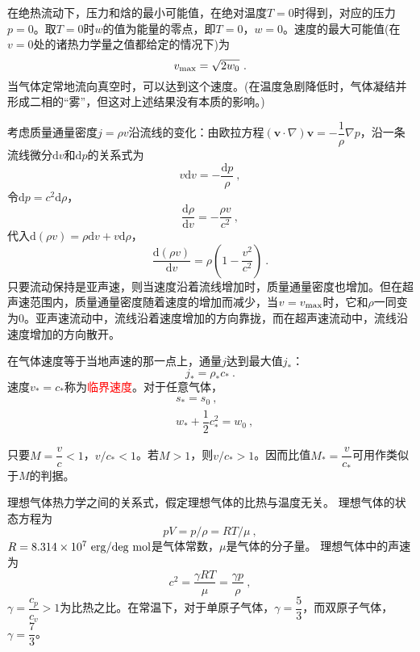 \documentclass[12pt,a4paper]{article}
\renewcommand{\vec}[1]{\boldsymbol{#1}}
\newcommand{\dif}{\mathrm{d}}
\begin{document}
在绝热流动下，压力和焓的最小可能值，在绝对温度$T=0$时得到，对应的压力$p = 0$。取$T=0$时$w$的值为能量的零点，即$T=0$，$w=0$。速度的最大可能值(在$v=0$处的诸热力学量之值都给定的情况下)为
\begin{equation}
v_{\rm max} = \sqrt{2w_0} ~.
\end{equation}
当气体定常地流向真空时，可以达到这个速度。(在温度急剧降低时，气体凝结并形成二相的``雾”，但这对上述结果没有本质的影响。)

考虑质量通量密度$j = \rho v$沿流线的变化：由欧拉方程$(\vec{v} \cdot \nabla) \vec{v} = -\dfrac{1}{\rho} \nabla p$，沿一条流线微分$\dif v$和$\dif p$的关系式为
\begin{equation*}
v \dif v = -\dfrac{\dif p}{\rho} ~,
\end{equation*}
令$\dif p = c^2 \dif \rho$，
\begin{equation}
\dfrac{\dif \rho }{\dif v} = -\dfrac{\rho v}{c^2} ~,
\end{equation}
代入$\dif(\rho v) = \rho \dif v + v \dif \rho$，
\begin{equation}
\dfrac{\dif(\rho v)}{\dif v} = \rho \left(1- \dfrac{v^2}{c^2} \right) ~.
\end{equation}
只要流动保持是亚声速，则当速度沿着流线增加时，质量通量密度也增加。但在超声速范围内，质量通量密度随着速度的增加而减少，当$v = v_{\rm max}$时，它和$\rho$一同变为$0$。亚声速流动中，流线沿着速度增加的方向靠拢，而在超声速流动中，流线沿速度增加的方向散开。

在气体速度等于当地声速的那一点上，通量$j$达到最大值$j_\ast$：
\begin{equation}
j_\ast = \rho_\ast c_\ast ~.
\end{equation}
速度$v_\ast = c_\ast$称为\textcolor{red}{临界速度}。对于任意气体，
\begin{align}
& s_\ast = s_0 ~, \\
& w_\ast +\dfrac{1}{2} c_\ast^2 = w_0 ~,
\end{align}

只要$M = \dfrac{v}{c} < 1$，$v/c_\ast < 1$。若$M > 1$，则$v/c_\ast > 1$。因而比值$M_\ast = \dfrac{v}{c_\ast}$可用作类似于$M$的判据。

理想气体热力学之间的关系式，假定理想气体的比热与温度无关。
理想气体的状态方程为
\begin{equation}
pV = p/\rho = RT/\mu ~,
\end{equation}
$R = 8.314\times 10^7 ~ {\rm erg/deg ~mol}$是气体常数，$\mu$是气体的分子量。 理想气体中的声速为
\begin{equation}
c^2 = \dfrac{\gamma RT}{\mu} = \dfrac{\gamma p}{\rho} ~,
\end{equation}
$\gamma = \dfrac{c_p}{c_v} > 1$为比热之比。在常温下，对于单原子气体，$\gamma = \dfrac{5}{3}$，而双原子气体，$\gamma = \dfrac{7}{3}$。
\end{document}
